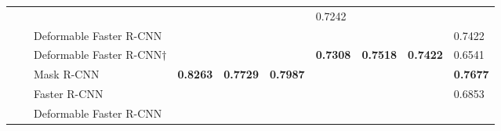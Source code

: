 \documentclass{ieeeaccess}
\begin{document}
\begin{table*}
\begin{tabularx}{\linewidth}{|u|u|t|v|v|k|v|v|k|k|}
        \footnotesize {}&
        \footnotesize {}&
        \footnotesize {}&
        \footnotesize {}&
        \footnotesize {}&
        \footnotesize {}&
        \footnotesize 
        {0.7242} \\
        & &\footnotesize  Deformable Faster R-CNN &
        
        \footnotesize {}&
        \footnotesize {}&
        \footnotesize {}&
        \footnotesize {}&
        \footnotesize {}&
        \footnotesize {}&
        \footnotesize {0.7422} \\
         & &\footnotesize  Deformable Faster R-CNN$\dagger$&
        \footnotesize {}&
        \footnotesize {}&
        \footnotesize {}&
        \footnotesize \centering \textbf{0.7308}&
        \footnotesize \centering \textbf{0.7518}&
        \footnotesize \centering \textbf{0.7422}&
        \footnotesize {0.6541} \\
        & &\footnotesize  Mask R-CNN&
        \footnotesize \centering \textbf{0.8263}&
        \footnotesize \centering \textbf{0.7729}&
        \footnotesize \centering \textbf{0.7987}&
        \footnotesize {}&
        \footnotesize {}&
        \footnotesize {}&
        \footnotesize \textbf{0.7677} \\
        & \footnotesize {}&
        \footnotesize  Faster R-CNN&
        \footnotesize {}&
        \footnotesize {}&
        \footnotesize {}&
        \footnotesize {}&
        \footnotesize {}&
        \footnotesize {}&
        \footnotesize 
        {0.6853} \\
        & &\footnotesize  Deformable Faster R-CNN &
        

\end{tabularx}
\end{table*}
\end{document}
